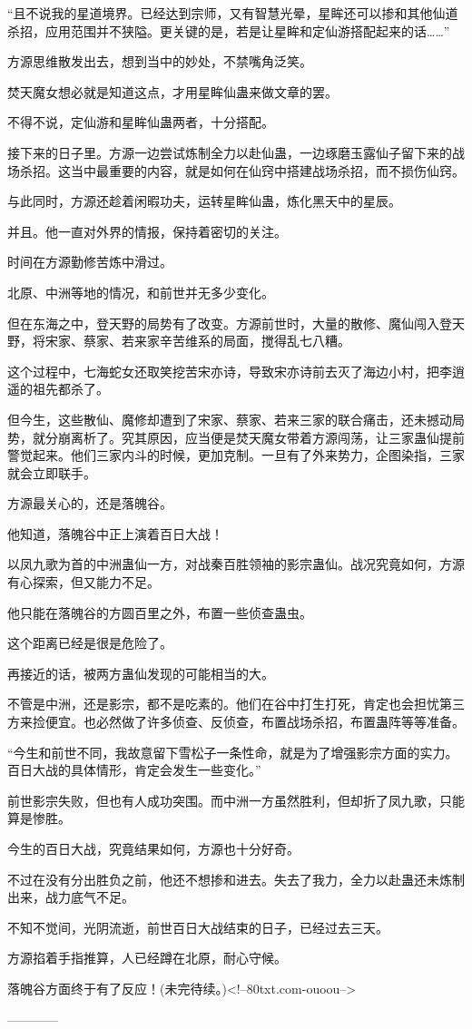 \begin{this_body}
“且不说我的星道境界。已经达到宗师，又有智慧光晕，星眸还可以掺和其他仙道杀招，应用范围并不狭隘。更关键的是，若是让星眸和定仙游搭配起来的话……”

方源思维散发出去，想到当中的妙处，不禁嘴角泛笑。

焚天魔女想必就是知道这点，才用星眸仙蛊来做文章的罢。

不得不说，定仙游和星眸仙蛊两者，十分搭配。

接下来的日子里。方源一边尝试炼制全力以赴仙蛊，一边琢磨玉露仙子留下来的战场杀招。这当中最重要的内容，就是如何在仙窍中搭建战场杀招，而不损伤仙窍。

与此同时，方源还趁着闲暇功夫，运转星眸仙蛊，炼化黑天中的星辰。

并且。他一直对外界的情报，保持着密切的关注。

时间在方源勤修苦炼中滑过。

北原、中洲等地的情况，和前世并无多少变化。

但在东海之中，登天野的局势有了改变。方源前世时，大量的散修、魔仙闯入登天野，将宋家、蔡家、若来家辛苦维系的局面，搅得乱七八糟。

这个过程中，七海蛇女还取笑挖苦宋亦诗，导致宋亦诗前去灭了海边小村，把李逍遥的祖先都杀了。

但今生，这些散仙、魔修却遭到了宋家、蔡家、若来三家的联合痛击，还未撼动局势，就分崩离析了。究其原因，应当便是焚天魔女带着方源闯荡，让三家蛊仙提前警觉起来。他们三家内斗的时候，更加克制。一旦有了外来势力，企图染指，三家就会立即联手。

方源最关心的，还是落魄谷。

他知道，落魄谷中正上演着百日大战！

以凤九歌为首的中洲蛊仙一方，对战秦百胜领袖的影宗蛊仙。战况究竟如何，方源有心探索，但又能力不足。

他只能在落魄谷的方圆百里之外，布置一些侦查蛊虫。

这个距离已经是很是危险了。

再接近的话，被两方蛊仙发现的可能相当的大。

不管是中洲，还是影宗，都不是吃素的。他们在谷中打生打死，肯定也会担忧第三方来捡便宜。也必然做了许多侦查、反侦查，布置战场杀招，布置蛊阵等等准备。

“今生和前世不同，我故意留下雪松子一条性命，就是为了增强影宗方面的实力。百日大战的具体情形，肯定会发生一些变化。”

前世影宗失败，但也有人成功突围。而中洲一方虽然胜利，但却折了凤九歌，只能算是惨胜。

今生的百日大战，究竟结果如何，方源也十分好奇。

不过在没有分出胜负之前，他还不想掺和进去。失去了我力，全力以赴蛊还未炼制出来，战力底气不足。

不知不觉间，光阴流逝，前世百日大战结束的日子，已经过去三天。

方源掐着手指推算，人已经蹲在北原，耐心守候。

落魄谷方面终于有了反应！(未完待续。)<!--80txt.com-ouoou-->

------------

\end{this_body}

